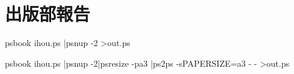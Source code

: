 \chapter{出版部報告}

psbook ihou.ps |psnup -2 >out.ps

psbook ihou.ps |psnup -2|psresize -pa3 |ps2ps -sPAPERSIZE=a3 - - >out.ps
